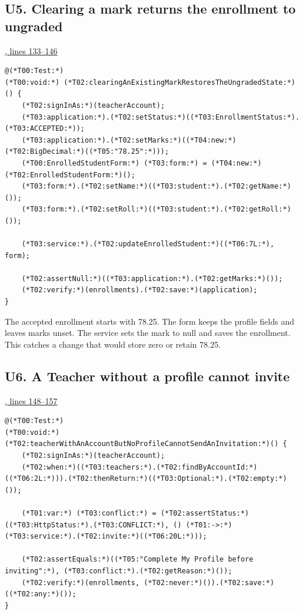 \clearpage
\subsection{U5. Clearing a mark returns the enrollment to ungraded}
\par\smallskip
{\small\href{\repo/blob/5d22aed7f6d4ef1e4c0b0c0dabf2962ba4b47608/src/test/java/com/example/fmschool/EnrollmentServiceUnitTests.java#L133-L146}{, lines 133--146}}
\begin{lstlisting}[style=vsJava,firstnumber=133]
@(*T00:Test:*)
(*T00:void:*) (*T02:clearingAnExistingMarkRestoresTheUngradedState:*)() {
    (*T02:signInAs:*)(teacherAccount);
    (*T03:application:*).(*T02:setStatus:*)((*T03:EnrollmentStatus:*).(*T03:ACCEPTED:*));
    (*T03:application:*).(*T02:setMarks:*)((*T04:new:*) (*T02:BigDecimal:*)((*T05:"78.25":*)));
    (*T00:EnrolledStudentForm:*) (*T03:form:*) = (*T04:new:*) (*T02:EnrolledStudentForm:*)();
    (*T03:form:*).(*T02:setName:*)((*T03:student:*).(*T02:getName:*)());
    (*T03:form:*).(*T02:setRoll:*)((*T03:student:*).(*T02:getRoll:*)());

    (*T03:service:*).(*T02:updateEnrolledStudent:*)((*T06:7L:*), form);

    (*T02:assertNull:*)((*T03:application:*).(*T02:getMarks:*)());
    (*T02:verify:*)(enrollments).(*T02:save:*)(application);
}
\end{lstlisting}


The accepted enrollment starts with 78.25. The form keeps the profile fields
and leaves marks unset. The service sets the mark to null and saves the
enrollment. This catches a change that would store zero or retain 78.25.

\subsection{U6. A Teacher without a profile cannot invite}
\par\smallskip
{\small\href{\repo/blob/5d22aed7f6d4ef1e4c0b0c0dabf2962ba4b47608/src/test/java/com/example/fmschool/EnrollmentServiceUnitTests.java#L148-L157}{, lines 148--157}}
\begin{lstlisting}[style=vsJava,firstnumber=148]
@(*T00:Test:*)
(*T00:void:*) (*T02:teacherWithAnAccountButNoProfileCannotSendAnInvitation:*)() {
    (*T02:signInAs:*)(teacherAccount);
    (*T02:when:*)((*T03:teachers:*).(*T02:findByAccountId:*)((*T06:2L:*))).(*T02:thenReturn:*)((*T03:Optional:*).(*T02:empty:*)());

    (*T01:var:*) (*T03:conflict:*) = (*T02:assertStatus:*)((*T03:HttpStatus:*).(*T03:CONFLICT:*), () (*T01:->:*) (*T03:service:*).(*T02:invite:*)((*T06:20L:*)));

    (*T02:assertEquals:*)((*T05:"Complete My Profile before inviting":*), (*T03:conflict:*).(*T02:getReason:*)());
    (*T02:verify:*)(enrollments, (*T02:never:*)()).(*T02:save:*)((*T02:any:*)());
}
\end{lstlisting}



